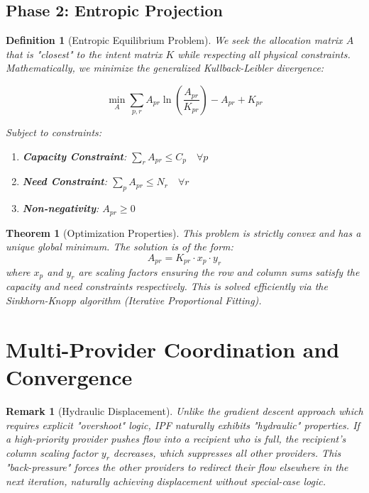 \documentclass[11pt]{article}
\newtheorem{definition}{Definition}
\newtheorem{theorem}{Theorem}
\newtheorem{remark}{Remark}
\begin{document}
\subsection{Phase 2: Entropic Projection}

\begin{definition}[Entropic Equilibrium Problem]
We seek the allocation matrix $A$ that is "closest" to the intent matrix $K$ while respecting all physical constraints. Mathematically, we minimize the generalized Kullback-Leibler divergence:

\[
\min_{A} \sum_{p,r} A_{pr} \ln \left( \frac{A_{pr}}{K_{pr}} \right) - A_{pr} + K_{pr}
\]

Subject to constraints:
\begin{enumerate}
   \item \textbf{Capacity Constraint}: $\sum_r A_{pr} \le C_p \quad \forall p$
   \item \textbf{Need Constraint}: $\sum_p A_{pr} \le N_r \quad \forall r$
   \item \textbf{Non-negativity}: $A_{pr} \ge 0$
\end{enumerate}
\end{definition}

\begin{theorem}[Optimization Properties]
This problem is strictly convex and has a unique global minimum. The solution is of the form:
\[ A_{pr} = K_{pr} \cdot x_p \cdot y_r \]
where $x_p$ and $y_r$ are scaling factors ensuring the row and column sums satisfy the capacity and need constraints respectively. This is solved efficiently via the Sinkhorn-Knopp algorithm (Iterative Proportional Fitting).
\end{theorem}

\section{Multi-Provider Coordination and Convergence}

\begin{remark}[Hydraulic Displacement]
Unlike the gradient descent approach which requires explicit "overshoot" logic, IPF naturally exhibits "hydraulic" properties. If a high-priority provider pushes flow into a recipient who is full, the recipient's column scaling factor $y_r$ decreases, which suppresses all other providers. This "back-pressure" forces the other providers to redirect their flow elsewhere in the next iteration, naturally achieving displacement without special-case logic.
\end{remark}
\end{document}
